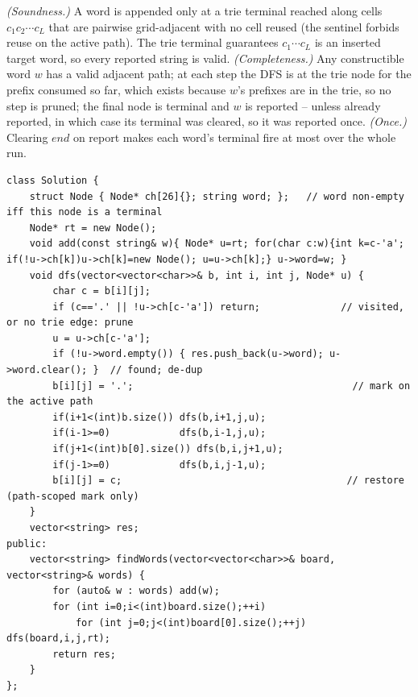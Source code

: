 \begin{proofbox}
\emph{(Soundness.)} A word is appended only at a trie terminal reached along cells $c_1c_2\cdots c_L$ that
are pairwise grid-adjacent with no cell reused (the sentinel forbids reuse on the active path). The trie
terminal guarantees $c_1\cdots c_L$ is an inserted target word, so every reported string is valid.
\emph{(Completeness.)} Any constructible word $w$ has a valid adjacent path; at each step the DFS is at
the trie node for the prefix consumed so far, which exists because $w$'s prefixes are in the trie, so no
step is pruned; the final node is terminal and $w$ is reported -- unless already reported, in which case
its terminal was cleared, so it was reported once. \emph{(Once.)} Clearing $\mathit{end}$ on report makes
each word's terminal fire at most over the whole run. \end{proofbox}

\begin{lstlisting}[caption={Word Search II -- grid DFS pruned by a trie of the words (LeetCode 212)}, label={lst:c08-wordsearch-soln}]
class Solution {
    struct Node { Node* ch[26]{}; string word; };   // word non-empty iff this node is a terminal
    Node* rt = new Node();
    void add(const string& w){ Node* u=rt; for(char c:w){int k=c-'a'; if(!u->ch[k])u->ch[k]=new Node(); u=u->ch[k];} u->word=w; }
    void dfs(vector<vector<char>>& b, int i, int j, Node* u) {
        char c = b[i][j];
        if (c=='.' || !u->ch[c-'a']) return;              // visited, or no trie edge: prune
        u = u->ch[c-'a'];
        if (!u->word.empty()) { res.push_back(u->word); u->word.clear(); }  // found; de-dup
        b[i][j] = '.';                                      // mark on the active path
        if(i+1<(int)b.size()) dfs(b,i+1,j,u);
        if(i-1>=0)            dfs(b,i-1,j,u);
        if(j+1<(int)b[0].size()) dfs(b,i,j+1,u);
        if(j-1>=0)            dfs(b,i,j-1,u);
        b[i][j] = c;                                       // restore (path-scoped mark only)
    }
    vector<string> res;
public:
    vector<string> findWords(vector<vector<char>>& board, vector<string>& words) {
        for (auto& w : words) add(w);
        for (int i=0;i<(int)board.size();++i)
            for (int j=0;j<(int)board[0].size();++j) dfs(board,i,j,rt);
        return res;
    }
};
\end{lstlisting}


